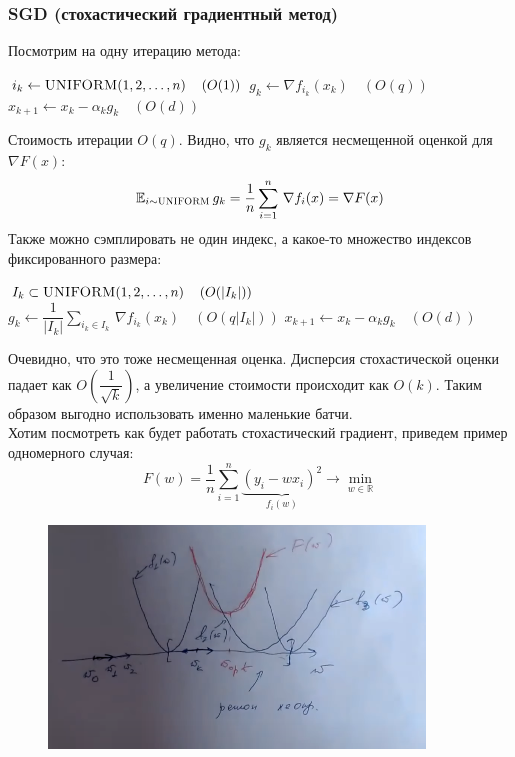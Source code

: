 \subsubsection{SGD (стохастический градиентный метод)}
Посмотрим на одну итерацию метода:
\begin{algorithmic}[1]
        \State $i_k \gets \textsc{UNIFORM}(1, 2, \dots , n) \quad \left(O(1)\right)$
        \State $g_k \gets \nabla f_{i_{k}}(x_k) \quad \left(O(q)\right)$
        \State $x_{k+1} \gets x_k - \alpha_k g_k \quad \left(O(d)\right)$
    \EndProcedure
\end{algorithmic}
Стоимость итерации $O(q)$. Видно, что $g_k$ является несмещенной оценкой для $\nabla F(x)$:
\[
    \mathbb{E}_{i \sim \textsc{UNIFORM}} \, g_k = \dfrac{1}{n} \sum\limits_{i=1}^{n} \, \nabla f_{i}(x) = \nabla F(x)
\]
Также можно сэмплировать не один индекс, а какое-то множество индексов фиксированного размера:
\begin{algorithmic}[1]
        \State $I_k \subset \textsc{UNIFORM}(1, 2, \dots , n) \quad \left(O(|I_k|)\right)$
        \State $g_k \gets \dfrac{1}{|I_k|} \sum\limits_{i_k \in I_k} \, \nabla f_{i_{k}}(x_k) \quad \left(O(q|I_k|)\right)$
        \State $x_{k+1} \gets x_k - \alpha_k g_k \quad \left(O(d)\right)$
    \EndProcedure
\end{algorithmic}
Очевидно, что это тоже несмещенная оценка. Дисперсия стохастической оценки падает как $O(\dfrac{1}{\sqrt{k}})$, а увеличение стоимости происходит как $O(k)$. Таким образом выгодно использовать именно маленькие батчи. \\
Хотим посмотреть как будет работать стохастический градиент, приведем пример одномерного случая:
\[
    F(w) = \dfrac{1}{n} \sum\limits_{i=1}^{n} \underbrace{(y_i - wx_i)^2}_{f_i(w)} \to \min\limits_{w \in \mathbb{R}}
\]
\begin{figure}[h]
    \center
    \includegraphics[width=10cm]{images/sgd.png}
\end{figure}
